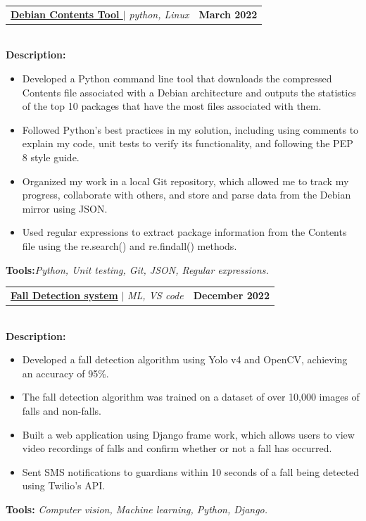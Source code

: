 \documentclass[letterpaper,11pt]{article}
\makeatletter
\newcommand{\resumeItem}[1]{
  \item\small{
    {#1 \vspace{-2pt}}
  }
}
\newcommand{\resumeProjectHeading}[2]{
    \item
    \begin{tabular*}{1.001\textwidth}{l@{\extracolsep{\fill}}r}
      \small#1 & \textbf{\small #2}\\
    \end{tabular*}\vspace{-7pt}
}
\newcommand{\resumeItemListStart}{\begin{itemize}}
\newcommand{\resumeItemListEnd}{\end{itemize}\vspace{-5pt}}
\makeatother
\begin{document}
          \resumeProjectHeading
          {\textbf{\href{https://github.com/saiyakkshit?tab=repositories}{Debian Contents Tool
}} $|$ \emph{python, Linux}}{March 2022}\\
          \vspace{6pt}
          \textbf{Description:}
           \vspace{-5pt}
          \resumeItemListStart
            \resumeItem{Developed a Python command line tool that downloads the compressed Contents file associated with a Debian architecture and outputs the statistics of the top 10 packages that have the most files associated with them.}
            \resumeItem{Followed Python's best practices in my solution, including using comments to explain my code, unit tests to verify its functionality, and following the PEP 8 style guide.}
            \resumeItem{Organized my work in a local Git repository, which allowed me to track my progress, collaborate with others, and store and parse data from the Debian mirror using JSON.}    
            \resumeItem{Used regular expressions to extract package information from the Contents file using the re.search() and re.findall() methods.}
          \resumeItemListEnd 
          \textbf{Tools:}\emph{Python, Unit testing, Git, JSON, Regular expressions.}
          \vspace{-15pt}

                

          \resumeProjectHeading          {\textbf{\href{https://github.com/saiyakkshit/Langversation}{Fall Detection system}} $|$ \emph{ML, VS code}}{December 2022}\\
          \vspace{6pt}
          \textbf{Description:}
         
          \vspace{-8pt}
          \resumeItemListStart
            \resumeItem{ Developed a fall detection algorithm using Yolo v4 and OpenCV, achieving an accuracy of 95\%.}
            \resumeItem{The fall detection algorithm was trained on a dataset of over 10,000 images of falls and non-falls.}
            \resumeItem{Built a web application using Django frame work, which allows users to view video recordings of falls and confirm whether or not a fall has occurred.}
            \resumeItem{Sent SMS notifications to guardians within 10 seconds of a fall being detected using Twilio's API.}
          \resumeItemListEnd 
          \textbf{Tools:}\emph{
Computer vision, Machine learning, Python, Django.}
\end{document}
